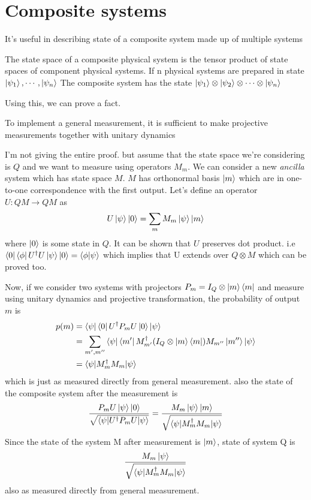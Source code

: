 \section{Composite systems}
It's useful in describing state of a composite system made up of multiple systems 

\begin{postulate}
    The state space of a composite physical system is the tensor product of state spaces of component physical systems. If n physical systems are prepared in state $\ket{\psi_1},\cdots,\ket{\psi_n}$
    The composite system has the state $\ket{\psi_1}\otimes\ket{\psi_2}\otimes\cdots\otimes\ket{\psi_n}$
\end{postulate}

Using this, we can prove a fact.
\begin{remark}
    To implement a general measurement, it is sufficient to make projective measurements together with unitary dynamics
\end{remark}
I'm not giving the entire proof. but assume that the state space we're considering is $Q$ and we want to measure using operators $M_m$. We can consider a new \textit{ancilla} system which has state space $M$. $M$ has orthonormal basis $\ket{m}$ which are in one-to-one correspondence with the first output. Let's define an operator $U:QM \xrightarrow{} QM$ as
\begin{equation}
    U\ket{\psi}\ket{0} = \sum_m M_m\ket{\psi}\ket{m}
\end{equation}
where $\ket{0}$ is some state in $Q$. It can be shown that $U$ preserves dot product. i.e $\bra{0}\bra{\phi}U^\dag U \ket{\psi}\ket{0} = 
\braket{\phi | \psi}$ which implies that U extends over $Q\otimes M$ which can be proved too.

Now, if we consider two systems with projectors $P_m = I_Q\otimes \ket{m} \bra{m}$ and measure using unitary dynamics and projective transformation, the probability of output $m$ is
\begin{align}
    p(m) &= \bra{\psi}\bra{0}U^\dag P_m U \ket{0}\ket{\psi} \\
    &= \sum_{m', m''}\bra{\psi}\bra{m'}M_{m'}^\dag (I_Q \otimes \ket{m}\bra{m})M_{m''}\ket{m''}\ket{\psi}\\
    &= \braket{\psi|M_m^\dag M_m | \psi}
\end{align}
which is just as measured directly from general measurement.
also the state of the composite system after the measurement is
\begin{align}
    \frac{P_mU\ket{\psi}\ket{0}}{\sqrt{\braket{
    \psi | U^\dag P_m U | \psi}
    }}
    =
    \frac{M_m\ket{\psi}\ket{m}}{
    \sqrt{
    \braket{\psi|M_m^\dag M_m | \psi}
    }
    }
\end{align}
Since the state of the system M after measurement is $\ket{m}$, state of system Q is
\begin{align}
    \frac{M_m\ket{\psi}}{\sqrt{
    \braket{\psi|M_m^\dag M_m | \psi}
    }}
\end{align}
also as measured directly from general measurement.

